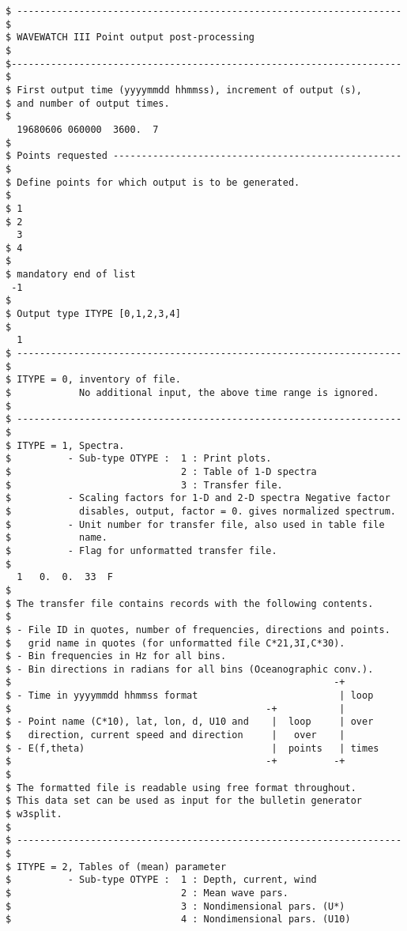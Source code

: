 \begin{footnotesize}
\begin{verbatim}
$ -------------------------------------------------------------------- $
$ WAVEWATCH III Point output post-processing                           $
$--------------------------------------------------------------------- $
$ First output time (yyyymmdd hhmmss), increment of output (s), 
$ and number of output times.
$
  19680606 060000  3600.  7
$
$ Points requested --------------------------------------------------- $
$ Define points for which output is to be generated. 
$
$ 1
$ 2
  3
$ 4
$
$ mandatory end of list
 -1
$
$ Output type ITYPE [0,1,2,3,4]
$
  1
$ -------------------------------------------------------------------- $
$ ITYPE = 0, inventory of file.
$            No additional input, the above time range is ignored.
$
$ -------------------------------------------------------------------- $
$ ITYPE = 1, Spectra.
$          - Sub-type OTYPE :  1 : Print plots.
$                              2 : Table of 1-D spectra
$                              3 : Transfer file.
$          - Scaling factors for 1-D and 2-D spectra Negative factor
$            disables, output, factor = 0. gives normalized spectrum.
$          - Unit number for transfer file, also used in table file
$            name.
$          - Flag for unformatted transfer file.
$
  1   0.  0.  33  F
$
$ The transfer file contains records with the following contents.
$
$ - File ID in quotes, number of frequencies, directions and points.
$   grid name in quotes (for unformatted file C*21,3I,C*30).
$ - Bin frequencies in Hz for all bins.
$ - Bin directions in radians for all bins (Oceanographic conv.).
$                                                         -+
$ - Time in yyyymmdd hhmmss format                         | loop
$                                             -+           |
$ - Point name (C*10), lat, lon, d, U10 and    |  loop     | over
$   direction, current speed and direction     |   over    |
$ - E(f,theta)                                 |  points   | times
$                                             -+          -+
$
$ The formatted file is readable using free format throughout.
$ This data set can be used as input for the bulletin generator
$ w3split.
$
$ -------------------------------------------------------------------- $
$ ITYPE = 2, Tables of (mean) parameter
$          - Sub-type OTYPE :  1 : Depth, current, wind
$                              2 : Mean wave pars.
$                              3 : Nondimensional pars. (U*)
$                              4 : Nondimensional pars. (U10)

\end{verbatim}
\end{footnotesize}
